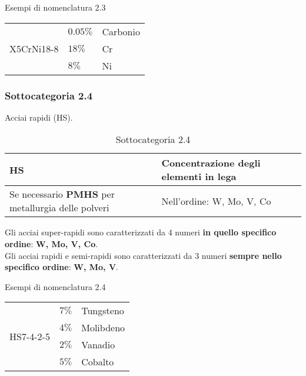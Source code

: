 \begin{example}{Esempi di nomenclatura 2.3}
\begin{tabularx}{\textwidth}{XXX}
\multirow{3}{*}{X5CrNi18-8} & $0.05\%$ & Carbonio\\
	& $18\%$ & Cr\\
	& $8\%$ & Ni\\
\end{tabularx}
\end{example}

\subsubsection{Sottocategoria 2.4}
Acciai rapidi (HS).

\begin{table}
\centering
\caption{Sottocategoria 2.4}\label{tab:Sotto4}
\begin{tabularx}{\textwidth}{|X|X|}
\toprule
\textbf{HS} & \textbf{Concentrazione degli elementi in lega}\\
\midrule
Se necessario \textbf{PMHS} per metallurgia delle polveri &
Nell'ordine: W, Mo, V, Co\\
\bottomrule
\end{tabularx}
\end{table}
Gli acciai super-rapidi sono caratterizzati da 4 numeri \textbf{in quello specifico ordine}: \textbf{W, Mo, V, Co}.\\
Gli acciai rapidi e semi-rapidi sono caratterizzati da 3 numeri \textbf{sempre nello specifico ordine}: \textbf{W, Mo, V}.\\

\begin{example}{Esempi di nomenclatura 2.4}
\begin{tabularx}{\textwidth}{XXX}
\multirow{4}{*}{HS7-4-2-5} & $7\%$ & Tungsteno\\
	& $4\%$ & Molibdeno\\
	& $2\%$ & Vanadio\\
	& $5\%$ & Cobalto\\
\end{tabularx}
\end{example}
